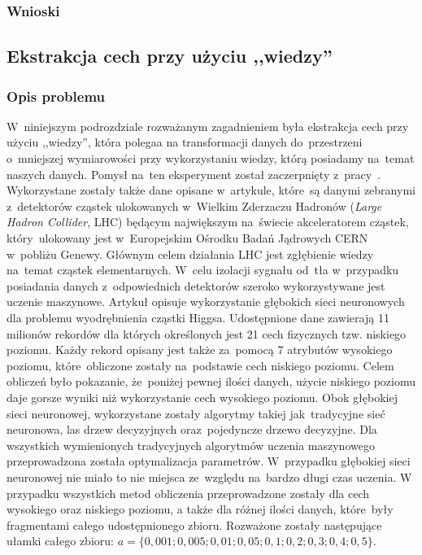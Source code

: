 \subsubsection{Wnioski}

\subsection{Ekstrakcja cech przy użyciu ,,wiedzy''}
\subsubsection{Opis problemu}
W~niniejszym podrozdziale rozważanym zagadnieniem była ekstrakcja cech przy użyciu ,,wiedzy'', która polegaa na transformacji danych do~przestrzeni o~mniejszej wymiarowości przy wykorzystaniu wiedzy, którą posiadamy na~temat naszych danych. Pomysł na~ten eksperyment został zaczerpnięty z~pracy~\cite{higgs1}. Wykorzystane zostały także dane opisane w~artykule, które~są danymi zebranymi z~detektorów cząstek ulokowanych w~Wielkim Zderzaczu Hadronów (\textit{Large Hadron Collider}, LHC) będącym największym na~świecie akceleratorem cząstek, który~ulokowany jest w~Europejskim Ośrodku Badań Jądrowych CERN w~pobliżu Genewy. Głównym celem działania LHC jest zgłębienie wiedzy na~temat cząstek elementarnych. W~celu izolacji sygnału od~tła w~przypadku posiadania danych z~odpowiednich detektorów szeroko wykorzystywane jest uczenie maszynowe. Artykuł opisuje wykorzystanie głębokich sieci neuronowych dla problemu wyodrębnienia cząstki Higgsa. Udostępnione dane zawierają 11 milionów rekordów dla których określonych jest 21 cech fizycznych tzw. niskiego poziomu. Każdy rekord opisany jest także za~pomocą 7 atrybutów wysokiego poziomu, które~obliczone zostały na~podstawie cech niskiego poziomu. Celem obliczeń było pokazanie, że~poniżej pewnej ilości danych, użycie niskiego poziomu daje gorsze wyniki niż wykorzystanie cech wysokiego poziomu. Obok głębokiej sieci neuronowej, wykorzystane zostały algorytmy takiej jak~tradycyjne sieć neuronowa, las drzew decyzyjnych oraz~pojedyncze drzewo decyzyjne. Dla wszystkich wymienionych tradycyjnych algorytmów uczenia maszynowego przeprowadzona została optymalizacja parametrów. W~przypadku głębokiej sieci neuronowej nie miało to nie miejsca ze~względu na~bardzo długi czas uczenia. W przypadku wszystkich metod obliczenia przeprowadzone zostały dla cech wysokiego oraz niskiego poziomu, a także dla różnej ilości danych, które~były fragmentami całego udostępnionego zbioru. Rozważone zostały następujące ułamki całego zbioru: $a=\{0,001; 0,005; 0,01; 0,05; 0,1; 0,2; 0,3; 0,4; 0,5\}$. 

